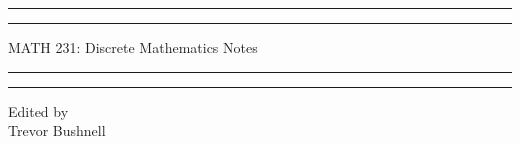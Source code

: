 \documentclass{package/notes}
\begin{document}
	\begin{titlepage} %
		
		\centering %
		
		\scshape %
		
		\vspace*{\baselineskip} %
		
		
		\rule{\textwidth}{1.6pt}\vspace*{-\baselineskip}\vspace*{2pt} %
		\rule{\textwidth}{0.4pt} %
		
		\vspace{0.75\baselineskip} %
		
		{\huge MATH 231: Discrete Mathematics Notes\\} %
		
		\vspace{0.75\baselineskip} %
		
		\rule{\textwidth}{0.4pt}\vspace*{-\baselineskip}\vspace{3.2pt} %
		\rule{\textwidth}{1.6pt} %
		
		\vspace{2\baselineskip} %
		
		
		\LARGE{} 
		
		\vspace*{3\baselineskip} %
		
		
		
		\vspace{0.5\baselineskip} 
		
		{\scshape  } %
		
		\vspace{0.5\baselineskip} 
		
		\textit{} %
		
		\vfill 
		
		
		
		\vspace{0.3\baselineskip} 
		
		
		{\large Edited by\\  Trevor Bushnell} 
		
	\end{titlepage}
	\tableofcontents
\end{document}
